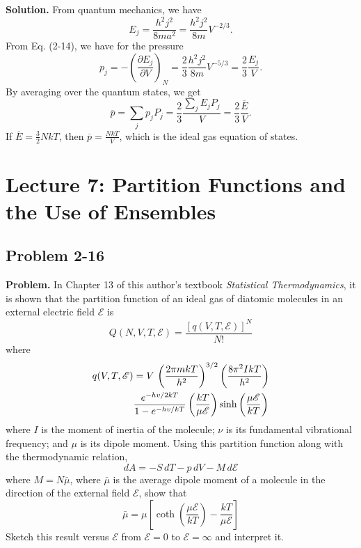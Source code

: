 \documentclass[twocolumn, 10pt]{article}
\numberwithin{equation}{section}
\newenvironment{problem}
{\par\medskip\sffamily \color{problue}
  \textbf{Problem. }\ignorespaces}
{\medskip}
\newenvironment{solution}
{\par\medskip
  \textbf{Solution. }\ignorespaces}
{\medskip}
\begin{document}
\begin{solution}
From quantum mechanics, we have
$$
E_j = \frac{ h^2 j^2 } { 8 m a^2 }
  =
  \frac{ h^2 j^2 } { 8 m } V^{-2/3}.
$$
From Eq. (2-14), we have for the pressure
$$
p_j = -\left( \frac{ \partial E_j } { \partial V } \right)_N
= \frac{2}{3} \frac{ h^2 j^2 } { 8 m } V^{-5/3}
= \frac{2}{3} \frac{ E_j } { V }.
$$
By averaging over the quantum states, we get
$$
  \overline p = \sum_j p_j P_j
  =
  \frac{2}{3} \frac{ \sum_j E_j P_j } { V}
  =
  \frac{2}{3} \frac{ \overline E } { V}.
$$
If $\overline E = \frac{3}{2} N k T$,
then $\overline p = \frac{ N k T } { V}$,
which is the ideal gas equation of states.
\end{solution}

\section{Lecture 7: Partition Functions and the Use of Ensembles}

\subsection{Problem 2-16}

\begin{problem}
In Chapter 13 of this author's textbook
\emph{Statistical Thermodynamics},
it is shown that the partition function of an ideal gas of diatomic molecules
in an external electric field $\mathscr E$ is
$$
Q(N, V, T, \mathscr E) = \frac{ [q(V, T, \mathscr E)]^N } { N! }
$$
where
\begin{align}
  q(V, T, \mathscr E)
  &= V \, \left( \frac{ 2 \pi m k T } { h^2 } \right)^{3/2}
  \left( \frac{ 8\pi^2 I k T } { h^2 } \right)
  \notag \\
  &\frac{ e^{-hv/2kT} } { 1 - e^{-hv/kT} }
  \left( \frac{ kT } { \mu \mathscr E } \right)
  \sinh\left( \frac{ \mu \mathscr E } { k T } \right)
\end{align}
%
where $I$ is the moment of inertia of the molecule;
$\nu$ is its fundamental vibrational frequency;
and $\mu$ is its dipole moment.
%
Using this partition function along with
the thermodynamic relation,
$$
dA = -S \, dT - p \, dV - M \, d\mathscr E
$$
where $M = N \bar\mu$,
where $\bar\mu$ is the average dipole moment
of a molecule in the direction of the external field $\mathscr E$,
show that
$$
\bar\mu = \mu \left[
  \coth\left( \frac{ \mu \mathscr E } { k T } \right)
  -\frac{ k T } { \mu \mathscr E }
  \right]
$$
Sketch this result versus $\mathscr E$
from $\mathscr E = 0$ to $\mathscr E = \infty$
and interpret it.
\end{problem}
\end{document}
